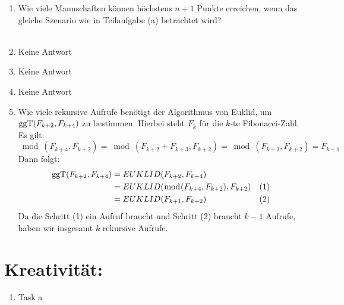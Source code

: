 \begin{enumerate}[label=(\alph*)]
        \item Wie viele Mannschaften können höchstens $n + 1$ Punkte erreichen, wenn das gleiche
		Szenario wie in Teilaufgabe (a) betrachtet wird? \\\\
		  
        
        \item Keine Antwort
        
        \item Keine Antwort
        
        \item Keine Antwort
        
        \item Wie viele rekursive Aufrufe benötigt der Algorithmus von Euklid, um $\operatorname{ggT}(F_{k+2},F_{k+4})$
		zu bestimmen. Hierbei steht $F_k$ für die $k$-te Fibonacci-Zahl.
		Es gilt:
		\[\bmod(F_{k+4},F_{k+2}) = \bmod(F_{k+2} + F_{k+3},F_{k+2}) = \bmod(F_{k+3},F_{k+2}) = F_{k+1}\]
		Dann folgt:
		\begin{align*}
			\operatorname{ggT}(F_{k+2},F_{k+4}) &= EUKLID(F_{k+2},F_{k+4}) \\
			 &= EUKLID(\bmod(F_{k+4},F_{k+2}),F_{k+2}) &(1) \\ 
			 &= EUKLID(F_{k+1},F_{k+2}) &(2)
		\end{align*}
		Da die Schritt (1) ein Aufruf braucht und Schritt (2) braucht $k-1$ Aufrufe, haben wir insgesamt
		$k$ rekursive Aufrufe.

    \end{enumerate}
    \section*{Kreativität:}
    \begin{enumerate}[label=(\alph*)]
    	\item Task a
    \end{enumerate}
